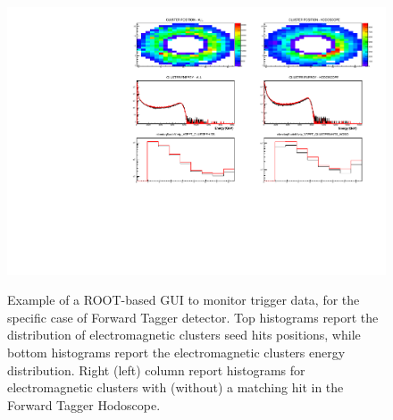 \begin{figure}[t]
  \includegraphics[width=\textwidth]{img/plotAndrea.pdf}
  \label{fig:plotAndrea}
  \caption{Example of a ROOT-based GUI to monitor trigger data, for the specific case of Forward Tagger detector. Top histograms report the distribution of electromagnetic clusters seed hits positions, while bottom histograms report the electromagnetic clusters energy distribution. Right (left) column report histograms for electromagnetic clusters  with (without) a matching hit in the Forward Tagger Hodoscope.}
\end{figure}

